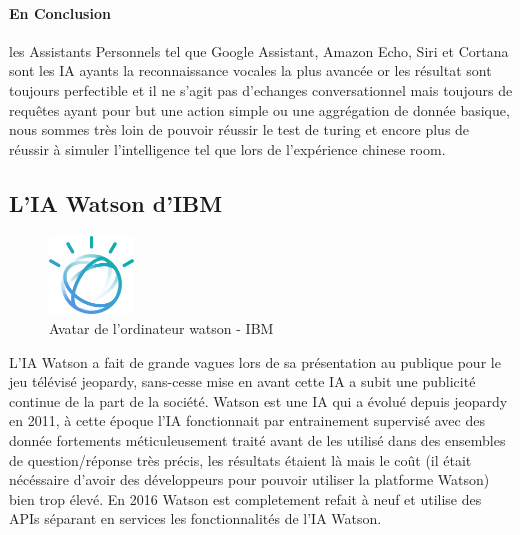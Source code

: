 \paragraph{En Conclusion} les Assistants Personnels tel que Google Assistant, Amazon Echo, Siri et
Cortana sont les IA ayants la reconnaissance vocales la plus avancée or les résultat sont toujours
perfectible et il ne s'agit pas d'echanges conversationnel mais toujours de requêtes
ayant pour but une action simple ou une aggrégation de donnée basique, nous sommes très loin
de pouvoir réussir le test de turing et encore plus de réussir à simuler l'intelligence tel que
lors de l'expérience chinese room.




\subsection*{L'IA Watson d'IBM}
\begin{figure}[H]
    \centering
    \includegraphics[width=0.2\textwidth]{Images/watsonlogo}
    \caption{Avatar de l'ordinateur watson - IBM}
    \label{fig:watsonlogo}
\end{figure}

L'IA Watson a fait de grande vagues lors de sa présentation au publique pour le jeu télévisé jeopardy,
sans-cesse mise en avant cette IA a subit une publicité continue de la part de la société.
Watson est une IA qui a évolué depuis jeopardy en 2011, à cette époque l'IA fonctionnait
par entrainement supervisé avec des donnée fortements méticuleusement traité avant de les utilisé
dans des ensembles de question/réponse très précis, les résultats étaient là mais le coût (il était
nécéssaire d'avoir des développeurs pour pouvoir utiliser la platforme Watson) bien trop élevé.
En 2016 Watson est completement refait à neuf et utilise des \gls{API}s séparant en services
les fonctionnalités de l'IA Watson. \newline

